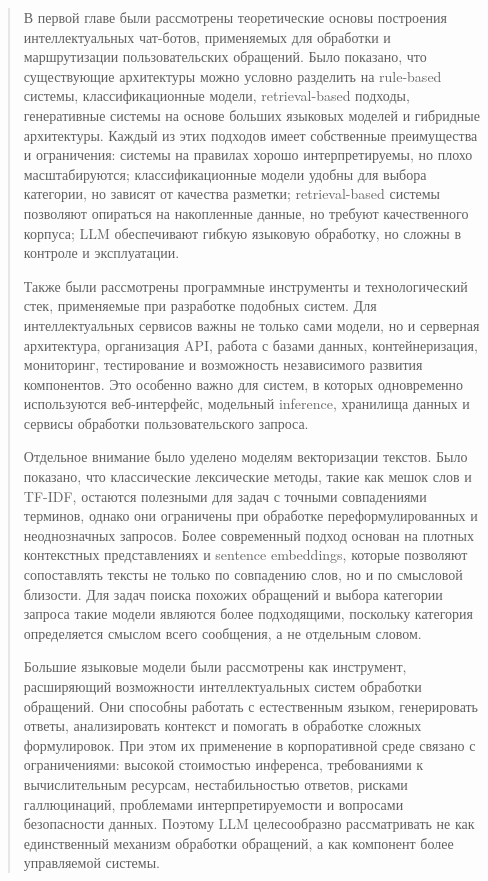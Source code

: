 \documentclass[
]{article}
\begin{document}
\begin{quote}
В первой главе были рассмотрены теоретические основы построения
интеллектуальных чат-ботов, применяемых для обработки и маршрутизации
пользовательских обращений. Было показано, что существующие архитектуры
можно условно разделить на rule-based системы, классификационные модели,
retrieval-based подходы, генеративные системы на основе больших языковых
моделей и гибридные архитектуры. Каждый из этих подходов имеет
собственные преимущества и ограничения: системы на правилах хорошо
интерпретируемы, но плохо масштабируются; классификационные модели
удобны для выбора категории, но зависят от качества разметки;
retrieval-based системы позволяют опираться на накопленные данные, но
требуют качественного корпуса; LLM обеспечивают гибкую языковую
обработку, но сложны в контроле и эксплуатации.

Также были рассмотрены программные инструменты и технологический стек,
применяемые при разработке подобных систем. Для интеллектуальных
сервисов важны не только сами модели, но и серверная архитектура,
организация API, работа с базами данных, контейнеризация, мониторинг,
тестирование и возможность независимого развития компонентов. Это
особенно важно для систем, в которых одновременно используются
веб-интерфейс, модельный inference, хранилища данных и сервисы обработки
пользовательского запроса.

Отдельное внимание было уделено моделям векторизации текстов. Было
показано, что классические лексические методы, такие как мешок слов и
TF-IDF, остаются полезными для задач с точными совпадениями терминов,
однако они ограничены при обработке переформулированных и неоднозначных
запросов. Более современный подход основан на плотных контекстных
представлениях и sentence embeddings, которые позволяют сопоставлять
тексты не только по совпадению слов, но и по смысловой близости. Для
задач поиска похожих обращений и выбора категории запроса такие модели
являются более подходящими, поскольку категория определяется смыслом
всего сообщения, а не отдельным словом.

Большие языковые модели были рассмотрены как инструмент, расширяющий
возможности интеллектуальных систем обработки обращений. Они способны
работать с естественным языком, генерировать ответы, анализировать
контекст и помогать в обработке сложных формулировок. При этом их
применение в корпоративной среде связано с ограничениями: высокой
стоимостью инференса, требованиями к вычислительным ресурсам,
нестабильностью ответов, рисками галлюцинаций, проблемами
интерпретируемости и вопросами безопасности данных. Поэтому LLM
целесообразно рассматривать не как единственный механизм обработки
обращений, а как компонент более управляемой системы.


\end{quote}
\end{document}
